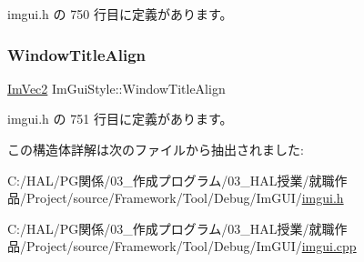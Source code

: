  imgui.\+h の 750 行目に定義があります。

\mbox{\label{struct_im_gui_style_a3fc57a15ab8f206045f1e5dfccd8b2e7}} 
\subsubsection{\texorpdfstring{Window\+Title\+Align}{WindowTitleAlign}}
{\footnotesize\ttfamily \mbox{\hyperlink{struct_im_vec2}{Im\+Vec2}} Im\+Gui\+Style\+::\+Window\+Title\+Align}



 imgui.\+h の 751 行目に定義があります。



この構造体詳解は次のファイルから抽出されました\+:\begin{DoxyCompactItemize}
\item 
C\+:/\+H\+A\+L/\+P\+G関係/03\+\_\+作成プログラム/03\+\_\+\+H\+A\+L授業/就職作品/\+Project/source/\+Framework/\+Tool/\+Debug/\+Im\+G\+U\+I/\mbox{\hyperlink{imgui_8h}{imgui.\+h}}\item 
C\+:/\+H\+A\+L/\+P\+G関係/03\+\_\+作成プログラム/03\+\_\+\+H\+A\+L授業/就職作品/\+Project/source/\+Framework/\+Tool/\+Debug/\+Im\+G\+U\+I/\mbox{\hyperlink{imgui_8cpp}{imgui.\+cpp}}\end{DoxyCompactItemize}
